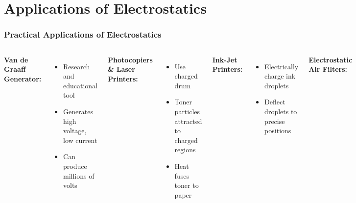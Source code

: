 \documentclass{beamer}
\begin{document}
\section{Applications of Electrostatics}

\begin{frame}
    \frametitle{Practical Applications of Electrostatics}
    
    \begin{columns}[t]
        \textbf{Van de Graaff Generator:}
        \begin{itemize}
            \item Research and educational tool
            \item Generates high voltage, low current
            \item Can produce millions of volts
        \end{itemize}
        
        \textbf{Photocopiers \& Laser Printers:}
        \begin{itemize}
            \item Use charged drum
            \item Toner particles attracted to charged regions
            \item Heat fuses toner to paper
        \end{itemize}
        
        \textbf{Ink-Jet Printers:}
        \begin{itemize}
            \item Electrically charge ink droplets
            \item Deflect droplets to precise positions
        \end{itemize}
        
        \textbf{Electrostatic Air Filters:}
        \begin{itemize}
            \item Charge air particles
            \item Attract charged particles to plates
            \item Remove pollutants from air
        \end{itemize}
    \end{columns}
\end{frame}
\end{document}
